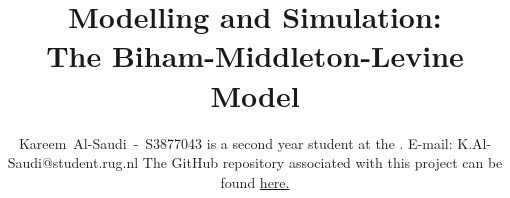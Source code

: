 \title{Modelling and Simulation: \\ The Biham-Middleton-Levine Model}

\author{Kareem~Al-Saudi~-~S3877043%
        \IEEEcompsocitemizethanks
        {
                \IEEEcompsocthanksitem \myName is a second year \myDegree student at the \myUni. E-mail: K.Al-Saudi@student.rug.nl
                \IEEEcompsocthanksitem The GitHub repository associated with this project can be found \href{https://github.com/KareemAlSaudi-RUG/Modelling-and-Simulation}{here.}
        }
}